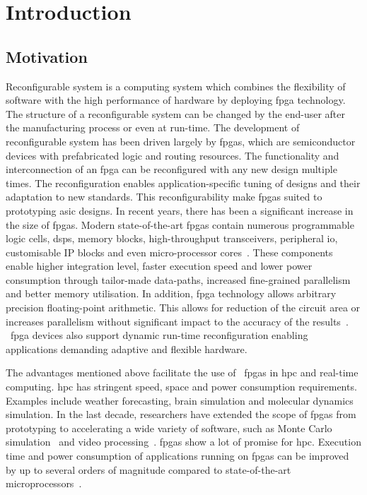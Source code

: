 
\chapter{Introduction}

\label{ch:introduction}

\section{Motivation}

Reconfigurable system is a computing system which combines the flexibility of software with the high performance of hardware by deploying \gls{fpga} technology.
The structure of a reconfigurable system can be changed by the end-user after the manufacturing process or even at run-time.
The development of reconfigurable system has been driven largely by \glspl{fpga}, which are semiconductor devices with prefabricated logic and routing resources.
The functionality and interconnection of an \gls{fpga} can be reconfigured with any new design multiple times.
The reconfiguration enables application-specific tuning of designs and their adaptation to new standards.
This reconfigurability make \glspl{fpga} suited to prototyping \gls{asic} designs.
In recent years, there has been a significant increase in the size of \glspl{fpga}.
Modern state-of-the-art \glspl{fpga} contain numerous programmable logic cells, \glspl{dsp}, memory blocks, high-throughput transceivers, peripheral \gls{io}, customisable IP blocks and even micro-processor cores~\cite{alterasoc,xilinxzynq}.
These components enable higher integration level, faster execution speed and lower power consumption through tailor-made data-paths, increased fine-grained parallelism and better memory utilisation.
In addition, \gls{fpga} technology allows arbitrary precision floating-point arithmetic.
This allows for reduction of the circuit area or increases parallelism without significant impact to the accuracy of the results~\cite{chow11,chow12}.
~\gls{fpga} devices also support dynamic run-time reconfiguration enabling applications demanding adaptive and flexible hardware. 

The advantages mentioned above facilitate the use of ~\glspl{fpga} in \gls{hpc} and real-time computing.
\gls{hpc} has stringent speed, space and power consumption requirements.
Examples include weather forecasting, brain simulation and molecular dynamics simulation. 
In the last decade, researchers have extended the scope of \glspl{fpga} from prototyping to accelerating a wide variety of software, such as Monte Carlo simulation~\cite{chow12} and video processing~\cite{guo04}.
\glspl{fpga} show a lot of promise for \gls{hpc}.
Execution time and power consumption of applications running on \glspl{fpga} can be improved by up to several orders of magnitude compared to state-of-the-art microprocessors~\cite{chow11,chow12,craven07,guo04,pell11}.

